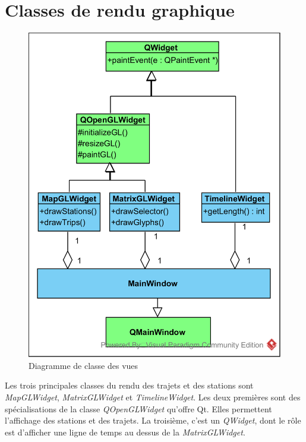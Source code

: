 \documentclass[12pt]{article}
\begin{document}
	\section{Classes de rendu graphique}
	
	\begin{figure}[!h]
	\begin{center}
	\includegraphics[scale=1]{dia_class_rendering.png}
	\caption{Diagramme de classe des vues}
	\label{fig:renduGraphique}
	\end{center}
	\end{figure}
	
	Les trois principales classes du rendu des trajets et des stations sont \textit{MapGLWidget}, \textit{MatrixGLWidget} et \textit{TimelineWidget}. Les deux premières sont des spécialisations de la classe \textit{QOpenGLWidget} qu’offre Qt. Elles permettent l’affichage des stations et des trajets. La troisième, c’est un \textit{QWidget}, dont le rôle est d’afficher une ligne de temps au
dessus de la \textit{MatrixGLWidget}.
	
\end{document}
